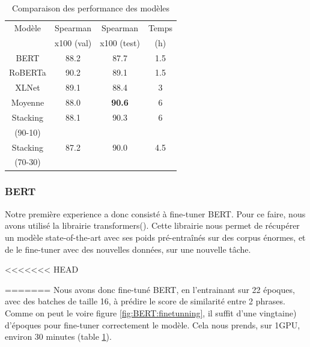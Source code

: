 \documentclass[11pt,a4paper, french]{article}
\begin{document}
\begin{table}[h!]
\centering
\begin{tabular}{|c| c c c|}
 \hline
 Modèle & Spearman & Spearman & Temps \\[0.5ex]
 & x100 (val) & x100 (test) & (h) \\
 \hline\hline
 BERT     & 88.2 & 87.7 & 1.5 \\
 \hline
 RoBERTa  & 90.2 & 89.1 & 1.5 \\
 \hline
 XLNet    & 89.1 & 88.4 & 3 \\
 \hline
 Moyenne  & 88.0 & \textbf{90.6} & 6 \\
 \hline
 Stacking & 88.1 & 90.3 & 6 \\
 (90-10)  & & & \\
 \hline
 Stacking & 87.2 & 90.0 & 4.5 \\
 (70-30)  &  & & \\
 \hline
 \hline
\end{tabular}
\caption{Comparaison des performance des modèles}
\label{table:models:results}
\end{table}
%
\subsubsection{BERT}

Notre première experience a donc consisté à fine-tuner BERT. Pour ce faire, nous avons utilisé la librairie transformers(\cite{huggingface}). Cette librairie nous permet de récupérer un modèle state-of-the-art avec ses poids pré-entraînés sur des corpus énormes, et de le fine-tuner avec des nouvelles données, sur une nouvelle tâche.

<<<<<<< HEAD

=======
Nous avons donc fine-tuné BERT, en l'entrainant sur 22 époques, avec des batches de taille 16, à prédire le score de similarité entre 2 phrases. Comme on peut le voire figure \ref{fig:BERT:finetunning}, il suffit d'une vingtaine) d'époques pour fine-tuner correctement le modèle. Cela nous prends, sur 1GPU, environ 30 minutes (table \ref{table:models:results}).
\end{document}
